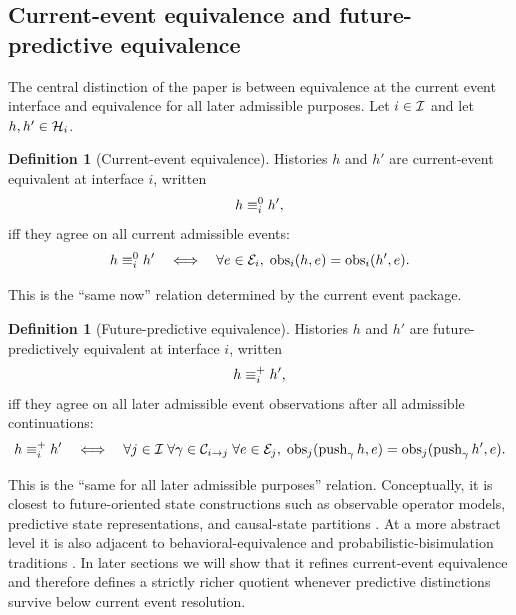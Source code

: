 \documentclass[11pt]{article}
\theoremstyle{definition}
\newtheorem{definition}[theorem]{Definition}
\begin{document}
\subsection{Current-event equivalence and future-predictive equivalence}\label{subsec:rtp-equivalences}
The central distinction of the paper is between equivalence at the current event interface and equivalence for all later admissible purposes. Let $i\in\mathcal{I}$ and let $h,h'\in\mathcal{H}_i$.

\begin{definition}[Current-event equivalence]\label{def:current-event-equivalence}
Histories $h$ and $h'$ are current-event equivalent at interface $i$, written
\[
h \equiv^{0}_i h',
\]
iff they agree on all current admissible events:
\begin{equation}
h \equiv^{0}_i h'
\quad\Longleftrightarrow\quad
\forall e\in\mathcal{E}_i,\;
\operatorname{obs}_i(h,e)=\operatorname{obs}_i(h',e).
\label{eq:current-equivalence}
\end{equation}
\end{definition}

This is the ``same now'' relation determined by the current event package.

\begin{definition}[Future-predictive equivalence]\label{def:future-predictive-equivalence}
Histories $h$ and $h'$ are future-predictively equivalent at interface $i$, written
\[
h \equiv^{+}_i h',
\]
iff they agree on all later admissible event observations after all admissible continuations:
\begin{equation}
h \equiv^{+}_i h'
\quad\Longleftrightarrow\quad
\forall j\in\mathcal{I}\;\forall \gamma\in\mathcal{C}_{i\to j}\;\forall e\in\mathcal{E}_j,\;
\operatorname{obs}_j(\operatorname{push}_{\gamma} h,e)
=
\operatorname{obs}_j(\operatorname{push}_{\gamma} h',e).
\label{eq:future-equivalence}
\end{equation}
\end{definition}

This is the ``same for all later admissible purposes'' relation. Conceptually, it is closest to future-oriented state constructions such as observable operator models, predictive state representations, and causal-state partitions \citep{Jaeger2000ObservableOperatorModels,LittmanSuttonSingh2002PredictiveRepresentationsState,ShaliziCrutchfield2001ComputationalMechanics}. At a more abstract level it is also adjacent to behavioral-equivalence and probabilistic-bisimulation traditions \citep{Milner1989CommunicationConcurrency,LarsenSkou1991BisimulationThroughProbabilisticTesting}. In later sections we will show that it refines current-event equivalence and therefore defines a strictly richer quotient whenever predictive distinctions survive below current event resolution.
\end{document}
